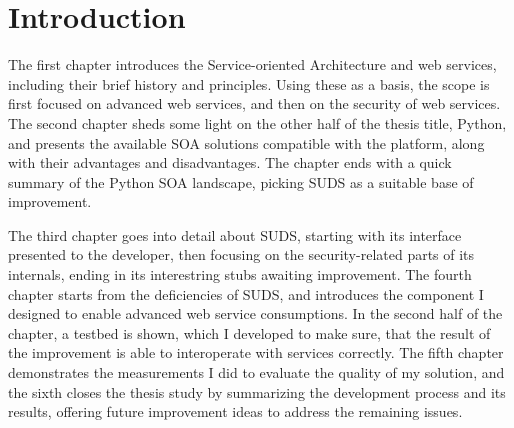 
\chapter*{Introduction}



The first chapter introduces the Service-oriented Architecture and web services, including their brief history and principles. Using these as a basis, the scope is first focused on advanced web services, and then on the security of web services. The second chapter sheds some light on the other half of the thesis title, Python, and presents the available SOA solutions compatible with the platform, along with their advantages and disadvantages. The chapter ends with a quick summary of the Python SOA landscape, picking SUDS as a suitable base of improvement.

The third chapter goes into detail about SUDS, starting with its interface presented to the developer, then focusing on the security-related parts of its internals, ending in its interestring stubs awaiting improvement. The fourth chapter starts from the deficiencies of SUDS, and introduces the component I designed to enable advanced web service consumptions. In the second half of the chapter, a testbed is shown, which I developed to make sure, that the result of the improvement is able to interoperate with services correctly. The fifth chapter demonstrates the measurements I did to evaluate the quality of my solution, and the sixth closes the thesis study by summarizing the development process and its results, offering future improvement ideas to address the remaining issues.
